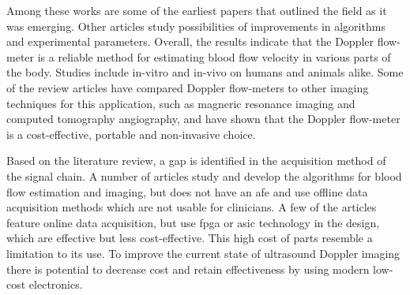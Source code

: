 Among these works are some of the earliest papers that outlined the field as it was emerging. Other articles study possibilities of improvements in algorithms and experimental parameters. Overall, the results indicate that the Doppler flow-meter is a reliable method for estimating blood flow velocity in various parts of the body. Studies include in-vitro and in-vivo on humans and animals alike. Some of the review articles have compared Doppler flow-meters to other imaging techniques for this application, such as magneric resonance imaging and computed tomography angiography, and have shown that the Doppler flow-meter is a cost-effective, portable and non-invasive choice.

Based on the literature review, a gap is identified in the acquisition method of the signal chain. A number of articles study and develop the algorithms for blood flow estimation and imaging, but does not have an \gls{afe} and use offline data acquisition methods which are not usable for clinicians. A few of the articles feature online data acquisition, but use \gls{fpga} or \gls{asic} technology in the design, which are effective but less cost-effective. This high cost of parts resemble a limitation to its use. To improve the current state of ultrasound Doppler imaging there is potential to decrease cost and retain effectiveness by using modern low-cost electronics.


